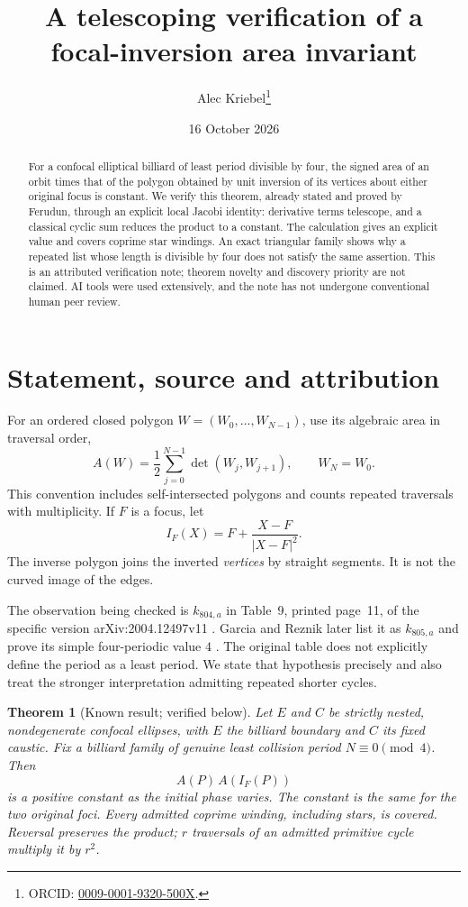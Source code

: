 \documentclass[11pt,letterpaper]{article}
\title{A telescoping verification of a\\focal-inversion area invariant}
\author{Alec Kriebel\thanks{ORCID:
\href{https://orcid.org/0009-0001-9320-500X}{0009-0001-9320-500X}.}}
\date{16 October 2026}
\newtheorem{theorem}{Theorem}
\begin{document}
\maketitle
\begin{abstract}
For a confocal elliptical billiard of least period divisible by four,
the signed area of an orbit times that of the polygon obtained by
unit inversion of its vertices about either original focus is constant.
We verify this theorem, already stated and proved by
Ferudun, through an explicit local Jacobi identity: derivative terms
telescope, and a classical cyclic sum reduces the product to a constant.
The calculation gives an explicit value and covers coprime star
windings. An exact triangular family shows why a repeated list whose
length is divisible by four does not satisfy the same assertion.
This is an attributed verification note; theorem novelty and discovery
priority are not claimed. AI tools were used extensively, and the note
has not undergone conventional human peer review.
\end{abstract}

\section{Statement, source and attribution}
For an ordered closed polygon $W=(W_0,\ldots,W_{N-1})$, use its
algebraic area in traversal order,
\[
 A(W)=\frac12\sum_{j=0}^{N-1}\det(W_j,W_{j+1}),\qquad W_N=W_0.
\]
This convention includes self-intersected polygons and counts
repeated traversals with multiplicity. If $F$ is a focus, let
\[
 I_F(X)=F+\frac{X-F}{|X-F|^2}.
\]
The inverse polygon joins the inverted \emph{vertices} by straight
segments. It is not the curved image of the edges.

The observation being checked is $k_{804,a}$ in Table~9, printed
page~11, of the specific version arXiv:2004.12497v11
\cite{reznik}. Garcia and Reznik later list it as $k_{805,a}$
and prove its simple four-periodic value $4$
\cite[Table~1 and Proposition~4.9]{garcia}.
The original table does not explicitly define the period as a least
period. We state that hypothesis precisely and also treat the
stronger interpretation admitting repeated shorter cycles.

\noindent\begin{minipage}{\linewidth}
\begin{theorem}[Known result; verified below]\label{thm}
Let $E$ and $C$ be strictly nested, nondegenerate confocal ellipses,
with $E$ the billiard boundary and $C$ its fixed caustic. Fix a
billiard family of genuine least collision period $N\equiv0\pmod4$.
Then
\[
                 A(P)\,A(I_F(P))
\]
is a positive constant as the initial phase varies. The constant is
the same for the two original foci. Every admitted coprime winding,
including stars, is covered. Reversal preserves the product; $r$
traversals of an admitted primitive cycle multiply it by $r^2$.
\end{theorem}
\end{minipage}\par\medskip
\end{document}
